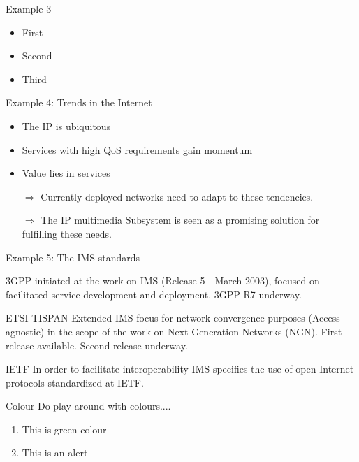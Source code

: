 \documentclass{beamer}
\begin{document}
\begin{frame}{Example 3}
\begin{itemize}
\item<1-> First
\item<2-> Second
\item<3-> Third
\end{itemize}
\end{frame}

\begin{frame}{Example 4: Trends in the Internet}
    \begin{itemize}
        \item The IP is ubiquitous
        \item Services with high QoS requirements   gain momentum
        \item Value lies in services
        \pause
        \item[$\Rightarrow$] Currently deployed networks need to adapt to these tendencies.
     \item[$\Rightarrow$] The IP multimedia Subsystem is seen as a promising solution for fulfilling these needs. 
    \end{itemize}
\end{frame}

\begin{frame}{Example 5: The IMS standards}
     \begin{block}{3GPP}
      initiated at the work on IMS (Release 5 - March 2003), focused on facilitated service development and deployment.
      3GPP R7 underway.   
     \end{block}
     \pause
     \begin{block}{ETSI TISPAN}
        Extended IMS focus for network convergence purposes (Access agnostic) in the scope of the work on Next Generation Networks (NGN).
        First release available. Second release underway.
     \end{block}
     \pause
     \begin{block}{IETF}
        In order to facilitate interoperability IMS specifies the use of open Internet protocols standardized at IETF.
     \end{block}
\end{frame}


\begin{frame}{Colour}
Do play around with colours....\\
\begin{enumerate}
\item <+-> This is green  colour\\
\item <+-> This is an \alert{alert}
\end{enumerate}
\end{frame}
\end{document}
